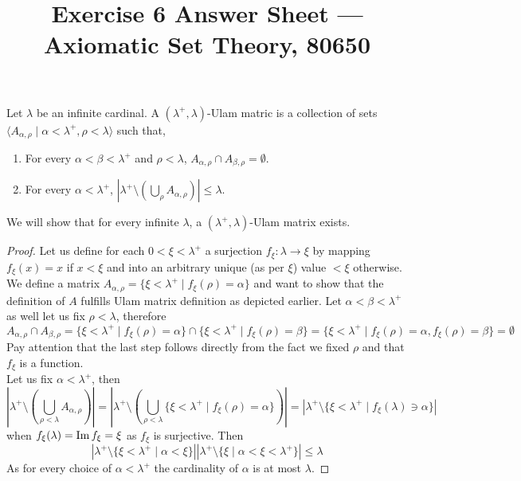 
\title{Exercise 6 Answer Sheet --- Axiomatic Set Theory, 80650}


\maketitle
\maketitleprint{}

\question{}
Let $\lambda$ be an infinite cardinal.
A $(\lambda^+, \lambda)$-Ulam matric is a collection of sets $\langle A_{\alpha, \rho} \mid \alpha < \lambda^+, \rho < \lambda \rangle$ such that,
\begin{enumerate}
	\item For every $\alpha < \beta < \lambda^+$ and $\rho < \lambda$, $A_{\alpha, \rho} \cap A_{\beta, \rho} = \emptyset$.
	\item For every $\alpha < \lambda^+$, $|\lambda^+ \setminus (\bigcup_\rho A_{\alpha, \rho})| \le \lambda$.
\end{enumerate}

\subquestion{}
We will show that for every infinite $\lambda$, a $(\lambda^+, \lambda)$-Ulam matrix exists.
\begin{proof}
	Let us define for each $0 < \xi < \lambda^+$ a surjection $f_\xi : \lambda \to \xi$ by mapping $f_\xi(x) = x$ if $x < \xi$ and into an arbitrary unique (as per $\xi$) value $< \xi$ otherwise.
	We define a matrix $A_{\alpha, \rho} = \{ \xi < \lambda^+ \mid f_\xi(\rho) = \alpha \}$ and want to show that the definition of $A$ fulfills Ulam matrix definition as depicted earlier.
	Let $\alpha < \beta < \lambda^+$ as well let us fix $\rho < \lambda$, therefore
	\[
		A_{\alpha, \rho} \cap A_{\beta, \rho}
		= \{ \xi < \lambda^+ \mid f_\xi(\rho) = \alpha \} \cap \{ \xi < \lambda^+ \mid f_\xi(\rho) = \beta \}
		= \{ \xi < \lambda^+ \mid f_\xi(\rho) = \alpha, f_\xi(\rho) = \beta \}
		= \emptyset
	\]
	Pay attention that the last step follows directly from the fact we fixed $\rho$ and that $f_\xi$ is a function. \\
	Let us fix $\alpha < \lambda^+$, then
	\[
		\left\lvert \lambda^+ \setminus \left(\bigcup_{\rho < \lambda} A_{\alpha, \rho}\right) \right\rvert
		= \left\lvert \lambda^+ \setminus \left(\bigcup_{\rho < \lambda} \{ \xi < \lambda^+ \mid f_\xi(\rho) = \alpha \} \right) \right\rvert
		= \left\lvert \lambda^+ \setminus \{ \xi < \lambda^+ \mid f_\xi(\lambda) \ni \alpha \} \right\rvert
	\]
	when $f_\xi(\lambda) = \operatorname{Im} f_\xi = \xi$ as $f_\xi$ is surjective.
	Then
	\[
		\left\lvert \lambda^+ \setminus \{ \xi < \lambda^+ \mid \alpha < \xi \} \right\rvert
		|\lambda^+ \setminus \{ \xi \mid \alpha < \xi < \lambda^+ \}|
		\le \lambda
	\]
	As for every choice of $\alpha < \lambda^+$ the cardinality of $\alpha$ is at most $\lambda$.
\end{proof}

